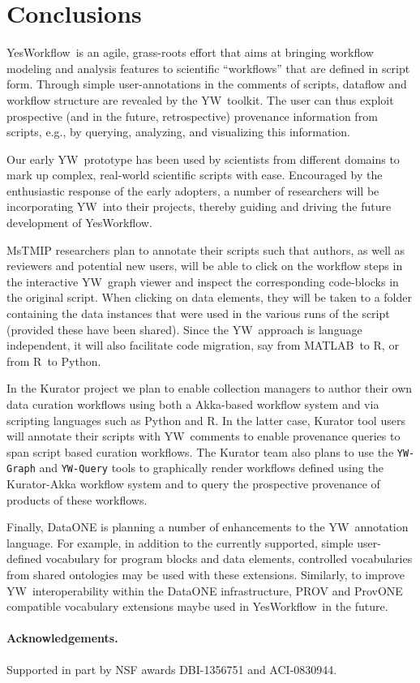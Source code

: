 \documentclass{article}
\newcommand{\YW}{\textsf{YesWorkflow}}
\newcommand{\yw}{\textsf{YW}}
\newcommand{\ywm}[1]{\texttt{#1}}
\newcommand{\R}{\textsf{R}}
\newcommand{\MATLAB}{\textsf{MATLAB}}
\begin{document}
\section{Conclusions}

\YW\ is an agile, grass-roots effort that aims at bringing workflow
modeling and analysis features to scientific ``workflows'' that are
defined in script form. Through simple user-annotations in the
comments of scripts, dataflow and workflow structure are revealed by
the \yw\ toolkit. The user can thus exploit prospective (and in the
future, retrospective) provenance information from scripts, e.g., by
querying, analyzing, and visualizing this information.

Our early \yw\ prototype \cite{YWgithub2015} has been used by
scientists from different domains to mark up complex, real-world
scientific scripts with ease. Encouraged by the enthusiastic response
of the early adopters, a number of researchers will be incorporating
\yw\ into their projects, thereby guiding and driving the future
development of \YW.

MsTMIP researchers plan to annotate their scripts such that authors,
as well as reviewers and potential new users, will be able to click on
the workflow steps in the interactive \yw\ graph viewer and inspect
the corresponding code-blocks in the original script. When clicking on
data elements, they will be taken to a folder containing the data
instances that were used in the various runs of the script (provided
these have been shared). Since the \yw\ approach is language
independent, it will also facilitate code migration, say from \MATLAB\
to \R, or from \R\ to Python.

In the Kurator project \cite{kuratorproject} we plan to enable
collection managers to author their own data curation workflows using
both a Akka-based workflow system and via scripting languages such as
Python and \R. In the latter case, Kurator tool users will annotate
their scripts with \yw\ comments to enable provenance queries to span
script based curation workflows.
The Kurator team also plans to use the \ywm{YW-Graph} and
\ywm{YW-Query} tools to graphically render workflows defined using the
Kurator-Akka workflow system and to query the prospective provenance
of products of these workflows.

Finally, DataONE is planning a number of enhancements to the \yw\
annotation language. For example, in addition to the currently
supported, simple user-defined vocabulary for program blocks and data
elements, controlled vocabularies from shared ontologies may be used
with these extensions. Similarly, to improve \yw\ interoperability
within the DataONE infrastructure, PROV \cite{moreau2013prov} and
ProvONE \cite{dataone2014provone} compatible vocabulary extensions
maybe used in \YW\ in the future.

\paragraph{Acknowledgements.} Supported in part by NSF awards DBI-1356751 and
ACI-0830944.

\small



\end{document}
